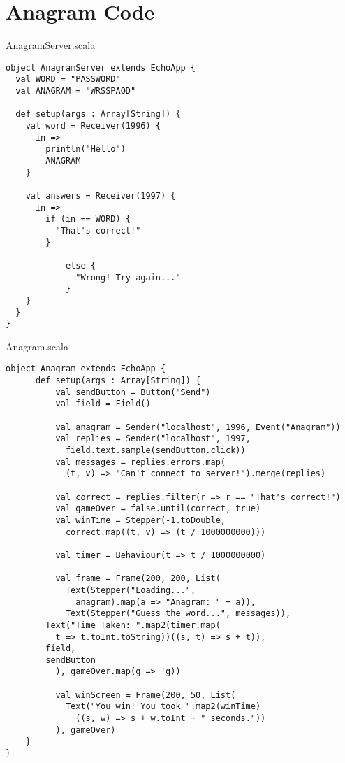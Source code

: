 \chapter{Anagram Code}

AnagramServer.scala

\begin{verbatim}
object AnagramServer extends EchoApp {
  val WORD = "PASSWORD"
  val ANAGRAM = "WRSSPAOD"

  def setup(args : Array[String]) {	
    val word = Receiver(1996) {
      in =>
        println("Hello")
        ANAGRAM
    }

  	val answers = Receiver(1997) {
  	  in =>
  	    if (in == WORD) {
  	      "That's correct!"
  	    }

  			else {
  			  "Wrong! Try again..."
  			}
  	}
  }
}
\end{verbatim}

Anagram.scala

\begin{verbatim}
object Anagram extends EchoApp {
	  def setup(args : Array[String]) {
		  val sendButton = Button("Send")
		  val field = Field()
		  
		  val anagram = Sender("localhost", 1996, Event("Anagram"))
		  val replies = Sender("localhost", 1997, 
		    field.text.sample(sendButton.click))
		  val messages = replies.errors.map(
		    (t, v) => "Can't connect to server!").merge(replies)

		  val correct = replies.filter(r => r == "That's correct!")
		  val gameOver = false.until(correct, true)
		  val winTime = Stepper(-1.toDouble, 
		    correct.map((t, v) => (t / 1000000000)))

		  val timer = Behaviour(t => t / 1000000000)

		  val frame = Frame(200, 200, List(
		    Text(Stepper("Loading...", 
		      anagram).map(a => "Anagram: " + a)),
		    Text(Stepper("Guess the word...", messages)),
        Text("Time Taken: ".map2(timer.map(
          t => t.toInt.toString))((s, t) => s + t)),
        field,
        sendButton
		  ), gameOver.map(g => !g))

		  val winScreen = Frame(200, 50, List(
		    Text("You win! You took ".map2(winTime)
		      ((s, w) => s + w.toInt + " seconds."))
		  ), gameOver)
	}
}
\end{verbatim}